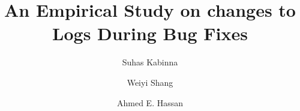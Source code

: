  
 \documentclass[smallextended]{svjour3}       %
 



%
\title{An Empirical Study on changes to Logs During Bug Fixes}

\author{Suhas Kabinna         \and
	Weiyi Shang \and
	Ahmed E. Hassan
}


